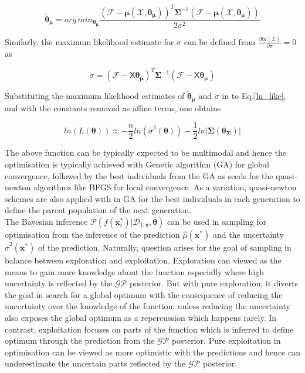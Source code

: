 \begin{equation}
\bm {\check{\theta}_{\bm \mu}} = arg\,{min}_{{\bm\theta_{\bm \mu}}} \frac{(\mathcal{F}-\bm{\mu}(\mathcal{X},{{\bm\theta_{\bm \mu}}}))^T\bm\Sigma^{-1}(\mathcal{F}-\bm{\mu}(\mathcal{X},{{\bm\theta_{\bm \mu}}}))}{2\sigma^2}
\end{equation} 

 Similarly, the maximum likelihood estimate for $\sigma$ can be defined from $\frac{\partial ln(L)}{\partial \sigma} =0$ as

\begin{equation}
\check{\sigma} =(\mathcal{F} - \mathsf{X}\bm\theta_{\bm \mu})^T\bm\Sigma^{-1}(\mathcal{F} - \mathsf{X}\bm \theta_{\bm \mu})
\end{equation}

Substituting the maximum likelihood estimates of $\check{\bm \theta}_{\bm \mu}$ and $\check{\sigma}$ in to Eq.{\eqref{ln_like}}, and with the constants removed as affine terms, one obtains

\begin{equation}\label{max_ln}
ln(L(\bm \theta)) \approx -\frac{n}{2}ln(\check{\sigma}^2(\bm \theta))-\frac{1}{2}ln|\bm \Sigma(\bm \theta_{\bm \Sigma})|
\end{equation}

The above function can be typically expected to be multimodal and hence the optimisation is typically achieved with Genetic algorithm (GA) for global convergence, followed by the best individuals from the GA as seeds for the quasi-newton algorithms like BFGS for local convergence. As a variation, quasi-newton schemes are also applied with in GA for the best individuals in each generation to define the parent population of the next generation.\\



The Bayesian inference $\mathcal{P}(f(\bm{x}_i^*)|\mathcal{D}_{1:{\mathfrak{n}}},\bm\theta)$ can be used in sampling for optimisation from the inference of the prediction $\hat{\mu}(\bm{\bm{x}}^*)$ and the uncertainty $\hat{\sigma}^2(\bm{x}^*)$ of the prediction. Naturally, question arises for the goal of sampling in balance between exploration and exploitation. Exploration can viewed as the means to gain more knowledge about the function especially where high uncertainty is reflected by the $\mathcal{GP}$ posterior. But with pure exploration, it diverts the goal in search for a global optimum with the consequence of reducing the uncertainty over the knowledge of the function, unless reducing the uncertainty also exposes the global optimum as a repercussion which happens rarely.  In contrast, exploitation focuses on parts of the function which is inferred to define optimum through the prediction from the $\mathcal{GP}$ posterior. Pure exploitation in optimisation can be viewed as more optimistic with the predictions and hence can underestimate the uncertain parts reflected by the $\mathcal{GP}$ posterior.\\

